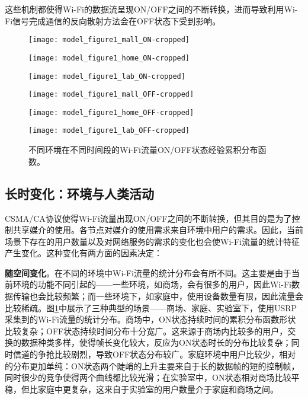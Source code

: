 这些机制都使得Wi-Fi的数据流呈现ON/OFF之间的不断转换，进而导致利用Wi-Fi信号完成通信的反向散射方法会在OFF状态下受到影响。
\begin{figure}
	\begin{minipage}[b]{.32\linewidth}
		\texttt{[image: model\_figure1\_mall\_ON-cropped]}
		\label{fig:ecdf_mall_on}
	\end{minipage}
	\hfill
	\begin{minipage}[b]{.32\linewidth}
		\texttt{[image: model\_figure1\_home\_ON-cropped]}
		\label{fig:ecdf_home_on}
	\end{minipage}
	\hfill
	\begin{minipage}[b]{.32\linewidth}
		\texttt{[image: model\_figure1\_lab\_ON-cropped]}
		\label{fig:ecdf_lab_on}
	\end{minipage}
	
	\begin{minipage}[b]{.32\linewidth}
		\texttt{[image: model\_figure1\_mall\_OFF-cropped]}
		\label{fig:ecdf_mall_off}
	\end{minipage}
	\hfill
	\begin{minipage}[b]{.32\linewidth}
		\texttt{[image: model\_figure1\_home\_OFF-cropped]}
		\label{fig:ecdf_home_off}
	\end{minipage}
	\hfill
	\begin{minipage}[b]{.32\linewidth}
		\texttt{[image: model\_figure1\_lab\_OFF-cropped]}
		\label{fig:ecdf_lab_off}
	\end{minipage}
	\caption{不同环境在不同时间段的Wi-Fi流量ON/OFF状态经验累积分布函数。}\label{fig:ecdf}
\end{figure}
\subsection{长时变化：环境与人类活动}
CSMA/CA协议使得Wi-Fi流量出现ON/OFF之间的不断转换，但其目的是为了控制共享媒介的使用。各节点对媒介的使用需求来自环境中用户的需求。因此，当前场景下存在的用户数量以及对网络服务的需求的变化也会使Wi-Fi流量的统计特征产生变化。这种变化有两方面的因素决定：

\textbf{随空间变化}。在不同的环境中Wi-Fi流量的统计分布会有所不同。这主要是由于当前环境的功能不同引起的——一些环境，如商场，会有很多的用户，因此Wi-Fi数据传输也会比较频繁；而一些环境下，如家庭中，使用设备数量有限，因此流量会比较稀疏。图\ref{fig:ecdf}中展示了三种典型的场景——商场、家庭、实验室下，使用USRP采集到的Wi-Fi流量的统计分布。商场中，ON状态持续时间的累积分布函数形状比较复杂；OFF状态持续时间分布十分宽广。这来源于商场内比较多的用户，交换的数据种类多样，使得帧长变化较大，反应为ON状态时长的分布比较复杂；同时信道的争抢比较剧烈，导致OFF状态分布较广。家庭环境中用户比较少，相对的分布更加单纯：ON状态两个陡峭的上升主要来自于长的数据帧的短的控制帧，同时很少的竞争使得两个曲线都比较光滑；在实验室中，ON状态相对商场比较平稳，但比家庭中更复杂，这来自于实验室的用户数量介于家庭和商场之间。

